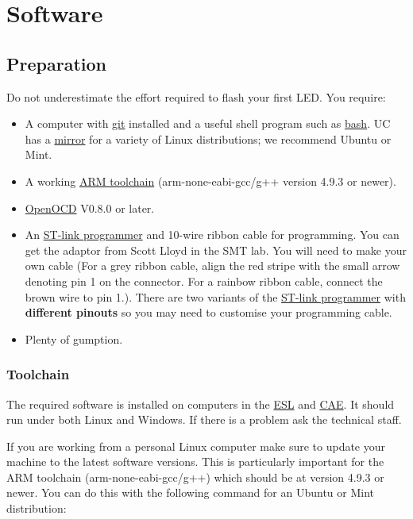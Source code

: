 \chapter{Software}

\section{Preparation}
\label{preparation}

Do not underestimate the effort required to flash your first LED. You
require:

\begin{itemize}
\item
  A computer with \url{git} installed and a useful shell program such as
  \url{bash}. UC has a \href{http://ucmirror.canterbury.ac.nz/}{mirror}
  for a variety of Linux distributions; we recommend Ubuntu or Mint.
\item
  A working \href{ARM_toolchain}{ARM toolchain} (arm-none-eabi-gcc/g++
  version 4.9.3 or newer).
\item
  \url{OpenOCD} V0.8.0 or later.
\item
  An \href{ST-link_programmer}{ST-link programmer} and 10-wire ribbon
  cable for programming. You can get the adaptor from Scott Lloyd in the
  SMT lab. You will need to make your own cable (For a grey ribbon
  cable, align the red stripe with the small arrow denoting pin 1 on the
  connector. For a rainbow ribbon cable, connect the brown wire to pin
  1.). There are two variants of the \href{ST-link_programmer}{ST-link
  programmer} with \textbf{different pinouts} so you may need to
  customise your programming cable.
\item
  Plenty of gumption.
\end{itemize}

\subsection{Toolchain}
\label{toolchain}

The required software is installed on computers in the \url{ESL} and
\url{CAE}. It should run under both Linux and Windows. If there is a
problem ask the technical staff.

If you are working from a personal Linux computer make sure to update
your machine to the latest software versions. This is particularly
important for the ARM toolchain (arm-none-eabi-gcc/g++) which should be
at version 4.9.3 or newer. You can do this with the following command
for an Ubuntu or Mint distribution:

